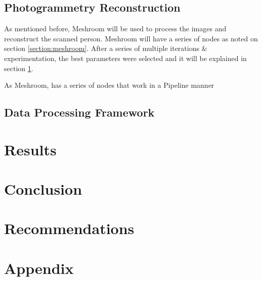 \documentclass[12pt]{report}
\begin{document}
\section{Photogrammetry Reconstruction}
\label{section:meshroom_method}
As mentioned before, Meshroom will be used to process the images and reconstruct the scanned person. 
Meshroom will have a series of nodes as noted on section \ref{section:meshroom}.
After a series of multiple iterations \& experimentation, the best parameters were selected and it will be explained in section \ref{section:meshroom_method}.

As Meshroom, has a series of nodes that work in a Pipeline manner

\section{Data Processing Framework}


\chapter{Results}

\chapter{Conclusion}

\chapter{Recommendations}

\nocite{*}   %



\appendix
\chapter{\vspace{-5.5cm}Appendix}
\end{document}
